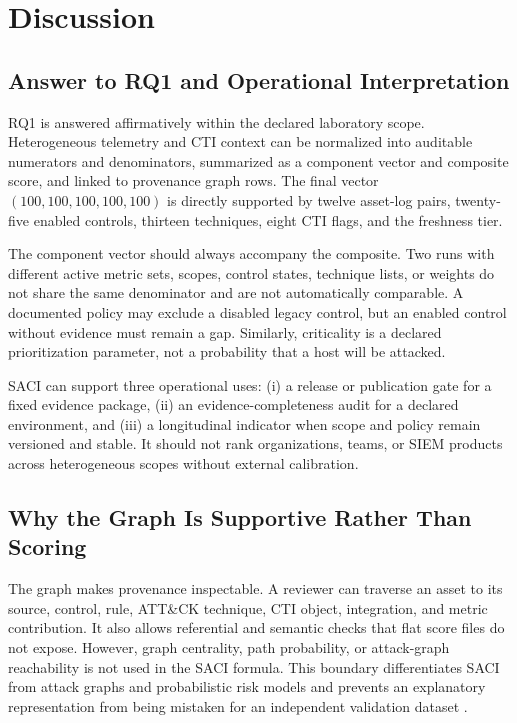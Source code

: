 \documentclass[a4paper,conference]{IEEEtran}
\begin{document}
\section{Discussion}
\subsection{Answer to RQ1 and Operational Interpretation}
RQ1 is answered affirmatively within the declared laboratory scope. Heterogeneous telemetry and CTI context can be normalized into auditable numerators and denominators, summarized as a component vector and composite score, and linked to provenance graph rows. The final vector $(100,100,100,100,100)$ is directly supported by twelve asset-log pairs, twenty-five enabled controls, thirteen techniques, eight CTI flags, and the freshness tier.

The component vector should always accompany the composite. Two runs with different active metric sets, scopes, control states, technique lists, or weights do not share the same denominator and are not automatically comparable. A documented policy may exclude a disabled legacy control, but an enabled control without evidence must remain a gap. Similarly, criticality is a declared prioritization parameter, not a probability that a host will be attacked.

SACI can support three operational uses: (i) a release or publication gate for a fixed evidence package, (ii) an evidence-completeness audit for a declared environment, and (iii) a longitudinal indicator when scope and policy remain versioned and stable. It should not rank organizations, teams, or SIEM products across heterogeneous scopes without external calibration.

\subsection{Why the Graph Is Supportive Rather Than Scoring}
The graph makes provenance inspectable. A reviewer can traverse an asset to its source, control, rule, ATT\&CK technique, CTI object, integration, and metric contribution. It also allows referential and semantic checks that flat score files do not expose. However, graph centrality, path probability, or attack-graph reachability is not used in the SACI formula. This boundary differentiates SACI from attack graphs and probabilistic risk models and prevents an explanatory representation from being mistaken for an independent validation dataset \cite{manadhata2011,liu2022}.
\end{document}
